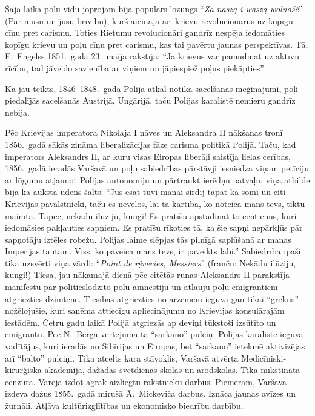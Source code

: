 \documentclass[twoside,a5paper,12pt,fleqn,openany]{extbook}
\newcommand{\pltxti}[1]{\textit{\textpolish{#1}}}
\newcommand{\frtxti}[1]{\textit{\textfrench{#1}}}
\begin{document}
Šajā laikā poļu vidū joprojām bija populārs lozungs ``\pltxti{Za naszą i waszą wolność}'' (Par mūsu un jūsu brīvību), kurš aicināja arī krievu revolucionārus uz kopīgu cīnu pret carismu. Toties Rietumu revolucionāri gandrīz nespēja iedomāties kopīgu krievu un poļu cīņu pret carismu, kas tai pavērtu jaunas perspektīvas. Tā, F.~Engelss 1851.~gada 23.~maijā rakstīja: ``Ja krievus var pamudināt uz aktīvu rīcību, tad jāveido savienība ar viņiem un jāpiespiež poļus piekāpties''.

Kā jau teikts, 1846--1848.~gadā Polijā atkal notika sacelšanās mēģinājumi, poļi piedalījās sacelšanās Austrijā, Ungārijā, taču Polijas karalistē nemieru gandrīz nebija.

Pēc Krievijas imperatora Nikolaja I nāves un Aleksandra II nākšanas tronī 1856.~gadā sākās zināma liberalizācijas fāze carisma politikā Polijā. Taču, kad imperators Aleksandrs II, ar kuru visas Eiropas liberāļi saistīja lielas cerības, 1856.~gadā ieradās Varšavā un poļu sabiedrības pārstāvji iesniedza viņam petīciju ar lūgumu atjaunot Polijas autonomiju un pārtraukt ierēdņu patvaļu, viņa atbilde bija kā auksta ūdens šalts: ``Jūs esat tuvi manai sirdij tāpat kā somi un citi Krievijas pavalstnieki, taču es nevēlos, lai tā kārtība, ko noteica mans tēvs, tiktu mainīta. Tāpēc, nekādu ilūziju, kungi! Es pratīšu apstādināt to centienus, kuri iedomāsies pakļauties sapņiem. Es pratīšu rīkoties tā, ka šie sapņi nepārkļūs pār sapņotāju iztēles robežu. Polijas laime slēpjas tās pilnīgā saplūšanā ar manas Impērijas tautām. Viss, ko paveica mans tēvs, ir paveikts labi.'' Sabiedrībā īpaši tika uzsvērti viņa vārdi: ``\frtxti{Point de rệveries, Messiers}'' (franču: Nekādu ilūziju, kungi!) Tiesa, jau nākamajā dienā pēc citētās runas Aleksandrs II parakstīja manifestu par politieslodzīto poļu amnestiju un atļauju poļu emigrantiem atgriezties dzimtenē. Tiesības atgriezties no ārzemēm ieguva gan tikai ``grēkus'' nožēlojušie, kuri saņēma attiecīgu apliecinājumu no Krievijas konsulārajām iestādēm. Četru gadu laikā Polijā atgriezās ap deviņi tūkstoši izsūtīto un emigrantu. Pēc N.~Berga vērtējuma tā ``sarkano'' pulciņi Polijas karalistē ieguva vadītājus, kuri ieradās no Sibīrijas un Eiropas, bet ``sarkano'' ietekmē aktivizējas arī ``balto'' pulciņi. Tika atcelts kara stāvoklis, Varšavā atvērta Medicīniski-ķirurģiskā akadēmija, dažādas svētdienas skolas un arodskolas. Tika mīkstināta cenzūra. Varēja izdot agrāk aizliegtu rakstnieku darbus. Piemēram, Varšavā izdeva dažus 1855.~gadā mirušā Ā.~Mickeviča darbus. Iznāca jaunas avīzes un žurnāli. Atļāva kultūrizglītības un ekonomisko biedrību darbību.
\end{document}
